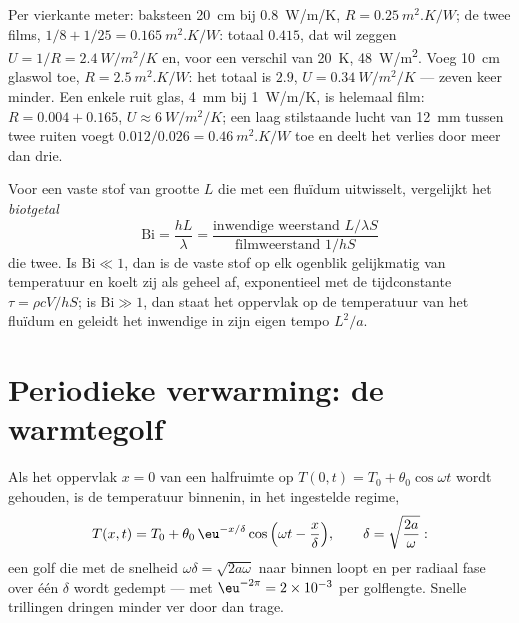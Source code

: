 \begin{example}\label{ex:b2:heat-conduction:wall}
Per vierkante meter: baksteen \qty{20}{cm} bij \qty{0.8}{W/m/K},
$R =
\qty{0.25}{m^2.K/W}$; de twee films,
$1/8 + 1/25 = \qty{0.165}{m^2.K/W}$:
totaal $0.415$, dat wil zeggen $U = 1/R = \qty{2.4}{W/m^2/K}$ en, voor een
verschil van \qty{20}{K},
\qty{48}{W/m^2}. Voeg \qty{10}{cm} glaswol toe, $R =
\qty{2.5}{m^2.K/W}$:
het totaal is $2.9$, $U = \qty{0.34}{W/m^2/K}$ ---
zeven keer minder. Een enkele ruit glas, \qty{4}{mm} bij \qty{1}{W/m/K},
is helemaal film: $R = 0.004 + 0.165$, $U \approx \qty{6}{W/m^2/K}$; een
laag stilstaande lucht van \qty{12}{mm} tussen twee ruiten voegt
$0.012/0.026 =
\qty{0.46}{m^2.K/W}$ toe en deelt het verlies door meer dan
drie.
\end{example}

\begin{definition}[Biotgetal]\label{def:b2:heat-conduction:biot}
Voor een vaste stof van grootte $L$ die met een fluïdum uitwisselt, vergelijkt het
\emph{biotgetal}
\[
\mathrm{Bi} = \frac{hL}{\lambda} = \frac{\text{inwendige weerstand } L/\lambda S}{\text{filmweerstand } 1/hS}
\]
die twee. Is $\mathrm{Bi} \ll 1$, dan is de vaste stof op elk ogenblik
gelijkmatig van temperatuur en koelt zij als geheel af, exponentieel met
de tijdconstante $\tau = \rho c V/hS$; is $\mathrm{Bi} \gg 1$, dan staat het
oppervlak op de temperatuur van het fluïdum en geleidt het inwendige in zijn
eigen tempo $L^2/a$.
\end{definition}

\section{Periodieke verwarming: de warmtegolf}

\begin{proposition}\label{prop:b2:heat-conduction:wave}
Als het oppervlak $x = 0$ van een halfruimte op
$T(0,t) = T_0 +
\theta_0\cos\omega t$ wordt gehouden, is de temperatuur
binnenin, in het
ingestelde regime,
\[
T(x,t) = T_0 + \theta_0\,\eu^{-x/\delta}\cos\Big(\omega t - \frac{x}{\delta}\Big),
\qquad \delta = \sqrt{\frac{2a}{\omega}} :
\]
een golf die met de snelheid $\omega\delta =
\sqrt{2a\omega}$ naar binnen
loopt en per radiaal fase over één
\emph{} $\delta$ wordt gedempt --- met
$\eu^{-2\pi} = 2 \times 10^{-3}$ per
golflengte. Snelle trillingen dringen minder ver door dan trage.
\end{proposition}

